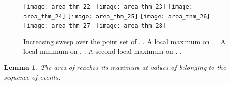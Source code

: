 \documentclass[11pt,letterpaper,english]{article}
\newtheorem{lemma}{Lemma}
\theoremstyle{definition}
\begin{document}
 \begin{figure}[ht]
    \centering
    \subcaptionbox{\label{apps:area:fig:bimodal_2:1}}
    {\texttt{[image: area\_thm\_22]}}
\hspace{-0.2cm}
    \subcaptionbox{\label{apps:area:fig:bimodal_2:2}}
    {\texttt{[image: area\_thm\_23]}}
\hspace{-0.2cm}
    \subcaptionbox{\label{apps:area:fig:bimodal_2:3}}
    {\texttt{[image: area\_thm\_24]}}
\hspace{-0.2cm}
    \subcaptionbox{\label{apps:area:fig:bimodal_2:4}}
    {\texttt{[image: area\_thm\_25]}}
\hspace{-0.2cm}
    \subcaptionbox{\label{apps:area:fig:bimodal_2:5}}
    {\texttt{[image: area\_thm\_26]}}
\hspace{-0.2cm}
    \subcaptionbox{\label{apps:area:fig:bimodal_2:6}}
    {\texttt{[image: area\_thm\_27]}}
\hspace{-0.2cm}
    \subcaptionbox{\label{apps:area:fig:bimodal_2:7}}
    {\texttt{[image: area\_thm\_28]}}
    \caption{Increasing sweep over the point set of
      . 
      .  A
      local maximum on
      . 
      . 
      A local minimum on
      . 
      . 
      A second local maximum on
      . 
      .}
    \label{apps:area:fig:bimodal_2}
  \end{figure}




\begin{lemma}\label{apps:area:lemma:events}
  The area of  reaches its maximum at values of 
  belonging to the sequence of events.
\end{lemma}
\end{document}
